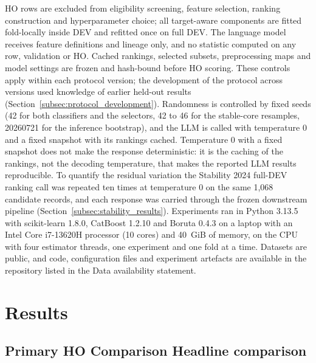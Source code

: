 \documentclass[final,5p,twocolumn]{elsarticle}
\providecommand{\DIFaddtex}[1]{{\protect\color{blue} \sf #1}} %
\providecommand{\DIFdeltex}[1]{{\protect\color{red} \scriptsize #1}} %
\providecommand{\DIFaddbegin}{} %
\providecommand{\DIFaddend}{} %
\providecommand{\DIFdelbegin}{} %
\providecommand{\DIFdelend}{} %
\providecommand{\DIFadd}[1]{\texorpdfstring{\DIFaddtex{#1}}{#1}} %
\providecommand{\DIFdel}[1]{\texorpdfstring{\DIFdeltex{#1}}{}} %
\begin{document}
HO rows are excluded from eligibility screening, feature selection, ranking construction and hyperparameter choice; all target-aware components are fitted fold-locally inside DEV and refitted once on full DEV. The language model receives feature definitions and lineage only, and no statistic computed on any row, validation or HO. Cached rankings, selected subsets, preprocessing maps and model settings are frozen and hash-bound before HO scoring. These controls apply within each protocol version; the development of the protocol across versions used knowledge of earlier held-out results (Section~\ref{subsec:protocol_development}). Randomness is controlled by fixed seeds (42 for both classifiers and the selectors, 42 to 46 for the stable-core resamples, 20260721 for the inference bootstrap), and the LLM is called with temperature 0 and a fixed snapshot with its rankings cached. Temperature 0 with a fixed snapshot does not make the response deterministic: it is the caching of the rankings, not the decoding temperature, that makes the reported LLM results reproducible. To quantify the residual variation the Stability 2024 full-DEV ranking call was repeated ten times at temperature 0 on the same 1,068 candidate records, and each response was carried through the frozen downstream pipeline (Section~\ref{subsec:stability_results}). Experiments ran in Python 3.13.5 with scikit-learn 1.8.0, CatBoost 1.2.10 and Boruta 0.4.3 on a laptop with an Intel Core i7-13620H processor (10 cores) and 40~GiB of memory, on the CPU with four estimator threads, one experiment and one fold at a time. Datasets are public, and code, configuration files and experiment artefacts are available in the repository listed in the Data availability statement.


\section{Results}
\label{sec:results}

\subsection{\DIFdelbegin \DIFdel{Primary HO Comparison}\DIFdelend \DIFaddbegin \DIFadd{Headline comparison}\DIFaddend }
\label{subsec:primary_results}
\end{document}
